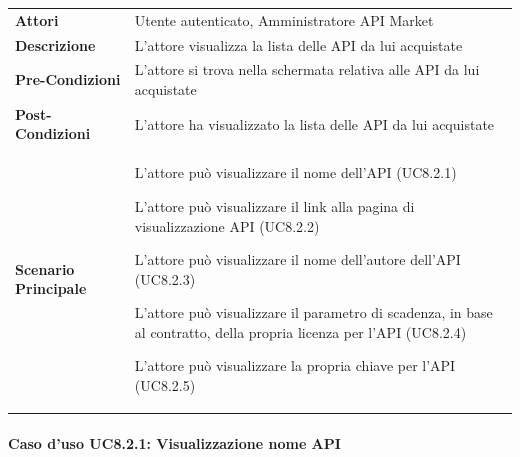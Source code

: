 \begin{minipage}{\linewidth}
	\begin{tabular}{ l | p{11cm}}
		\hline
		\rowcolor{Gray}
		\multicolumn{2}{c}{UC8.2 - Visualizzazione lista API acquistate} \\
		\hline
		\textbf{Attori} & Utente autenticato, Amministratore API Market \\
		\textbf{Descrizione} & L'attore visualizza la lista delle API da lui acquistate \\
		\textbf{Pre-Condizioni} & L'attore si trova nella schermata relativa alle API da lui acquistate \\
		\textbf{Post-Condizioni} & L'attore ha visualizzato la lista delle API da lui acquistate \\
		\textbf{Scenario Principale} & 
		\begin{enumerate*}[label=(\arabic*.),itemjoin={\newline}]
			\item L'attore può visualizzare il nome dell'API (UC8.2.1)
			\item L'attore può visualizzare il link alla pagina di visualizzazione API (UC8.2.2)
			\item L'attore può visualizzare il nome dell'autore dell'API (UC8.2.3)
			\item L'attore può visualizzare il parametro di scadenza, in base al contratto,  della propria licenza per l'API (UC8.2.4)
			\item L'attore può visualizzare la propria chiave per l'API (UC8.2.5)
		\end{enumerate*}\\
	\end{tabular}
\end{minipage}

\paragraph{Caso d'uso UC8.2.1: Visualizzazione nome API}
\label{UC8_2_1}

